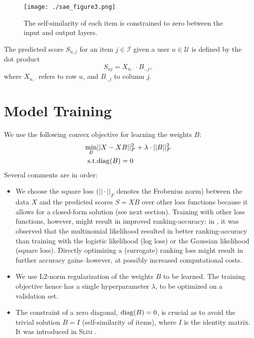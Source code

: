 \documentclass[sigconf]{acmart}
\newcommand{\slim}{{\scshape Slim}}
\newcommand{\W}{B}
\newcommand{\X}{X}
\newcommand{\Y}{X}
\newcommand{\I}{\mathcal{ I}}
\newcommand{\UU}{\mathcal{U}}
\newcommand{\diag}{{\rm diag}}
\begin{document}
\begin{figure}[t]
\begin{center}
\texttt{[image: ./sae\_figure3.png]}
\end{center}
\caption{The self-similarity of each item is constrained  to zero between the input and output layers.}
\label{fig_sae}
\end{figure}


The predicted score   $S_{u,j}$ for an item $j\in \I$ given a user  $u\in\UU$ is defined by the dot product
\begin{equation}
S_{uj}=\X_{u, \cdot} \cdot \W_{\cdot,j},
\label{eq_score}
\end{equation}
where $\X_{u, \cdot}$ refers to  row $u$, and $\W_{\cdot,j}$  to column $j$. 
\section{Model Training}
We use the following convex objective for learning the weights $\W$:
\begin{eqnarray}
\min_\W &||\Y-\X\W||_F^2 + \lambda\cdot ||\W||_F^2 \label{eq_opt}\\
{\rm s.t.}& \diag( \W)=0 \label{eq_const}
\end{eqnarray}
Several comments are in order:
\begin{itemize}
\item We choose the square loss ($||\cdot||_F$ denotes the Frobenius norm) between the data $\Y$ and the predicted scores $S=X\W$  over other loss functions because it allows for a closed-form solution (see next section). Training with other loss functions, however, might result in improved ranking-accuracy: in \cite{liang18}, it was observed that  the multinomial likelihood resulted in better ranking-accuracy than training with the logistic likelihood (log loss) or the Gaussian likelihood (square loss).  Directly optimizing a (surrogate) ranking loss might result in further accuracy gains--however, at possibly increased computational costs.
\item We use L2-norm regularization of the weights $\W$ to be learned. The training objective hence has a single hyperparameter $\lambda$, to be optimized on a  validation set.

\item The constraint of a zero diagonal, $\diag( \W)=0$,  is crucial as to avoid the trivial solution $\W=I$ (self-similarity of items), where $I$ is the identity matrix. It was introduced in \slim{} \cite{ning11}.
\end{itemize}
\end{document}
